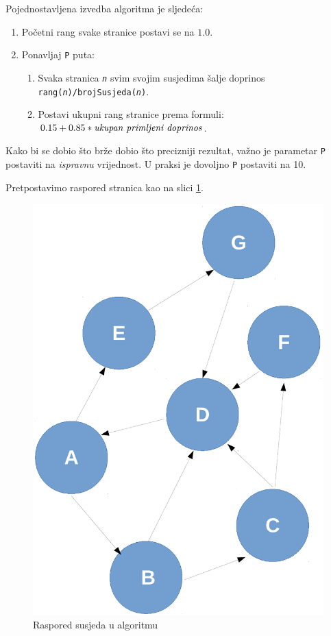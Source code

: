 \documentclass[times, utf8, zavrsni, numeric]{fer}
\begin{document}
Pojednostavljena izvedba algoritma je sljedeća:
\begin{enumerate}[label*=\arabic*.]
\item Početni rang svake stranice postavi se na $1.0$.
\item Ponavljaj \texttt{P} puta:
\begin{enumerate}[label*=\arabic*.]
\item Svaka stranica \texttt{\emph{n}} svim svojim susjedima šalje doprinos \texttt{rang(\emph{n})/brojSusjeda(\emph{n})}.
\item Postavi ukupni rang stranice prema formuli: $0.15 + 0.85*\emph{ukupan primljeni doprinos}$.
\end{enumerate}
\end{enumerate}

Kako bi se dobio što brže dobio što precizniji rezultat, važno je parametar \texttt{P} postaviti na \emph{ispravnu} vrijednost. U praksi je dovoljno \texttt{P} postaviti na 10. 

Pretpostavimo raspored stranica kao na slici \ref{fig:pageRankSusjedi}.

\begin{figure}[htb]
\centering
\includegraphics[scale = 0.5]{img/algoritamPageRankRucnoCropped.pdf}
\caption{Raspored susjeda u algoritmu}
\label{fig:pageRankSusjedi}
\end{figure}
\end{document}
